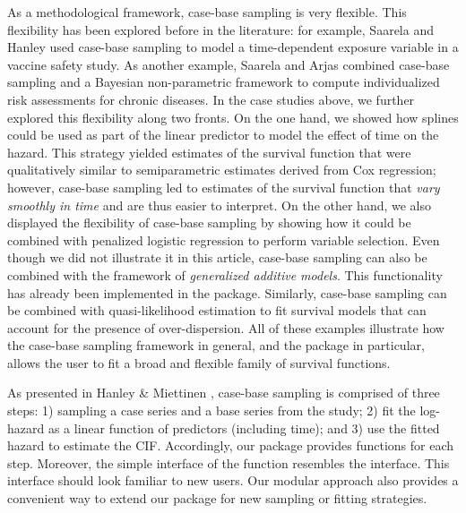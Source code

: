 \documentclass[
]{jss}
\begin{document}
As a methodological framework, case-base sampling is very flexible. This
flexibility has been explored before in the literature: for example,
Saarela and Hanley \citeyearpar{saarela2015case} used case-base sampling
to model a time-dependent exposure variable in a vaccine safety study.
As another example, Saarela and Arjas \citeyearpar{saarela2015non}
combined case-base sampling and a Bayesian non-parametric framework to
compute individualized risk assessments for chronic diseases. In the
case studies above, we further explored this flexibility along two
fronts. On the one hand, we showed how splines could be used as part of
the linear predictor to model the effect of time on the hazard. This
strategy yielded estimates of the survival function that were
qualitatively similar to semiparametric estimates derived from Cox
regression; however, case-base sampling led to estimates of the survival
function that \emph{vary smoothly in time} and are thus easier to
interpret. On the other hand, we also displayed the flexibility of
case-base sampling by showing how it could be combined with penalized
logistic regression to perform variable selection. Even though we did
not illustrate it in this article, case-base sampling can also be
combined with the framework of \emph{generalized additive models}. This
functionality has already been implemented in the package. Similarly,
case-base sampling can be combined with quasi-likelihood estimation to
fit survival models that can account for the presence of
over-dispersion. All of these examples illustrate how the case-base
sampling framework in general, and the package  in
particular, allows the user to fit a broad and flexible family of
survival functions.

As presented in Hanley \& Miettinen \citeyearpar{hanley2009fitting},
case-base sampling is comprised of three steps: 1) sampling a case
series and a base series from the study; 2) fit the log-hazard as a
linear function of predictors (including time); and 3) use the fitted
hazard to estimate the CIF. Accordingly, our package provides functions
for each step. Moreover, the simple interface of the
 function resembles the  interface.
This interface should look familiar to new users. Our modular approach
also provides a convenient way to extend our package for new sampling or
fitting strategies.
\end{document}
